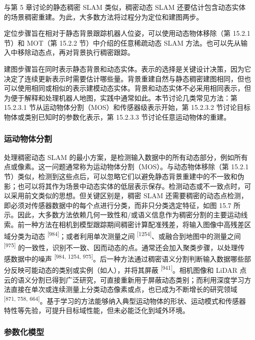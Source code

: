 与第 5 章讨论的静态稠密 SLAM 类似，稠密动态 SLAM 还要估计包含动态实体的场景稠密重建。为此，大多数方法将过程分为定位和建图两步。

定位步骤旨在相对于静态背景跟踪机器人位姿，可以使用动态物体移除（第 15.2.1 节）和 MOT（第 15.2.2 节）中介绍的任意稀疏动态 SLAM 方法。也可以先从输入中移除动态点，再对背景执行稠密跟踪。

建图步骤旨在同时表示静态背景和动态实体。表示的选择是关键设计决策，因为它决定了连续更新表示时需要估计哪些量。背景重建自然与静态稠密建图相同，但也可以使用相同或相似的表示建模动态实体。背景和动态实体不必采用相同表示，但为便于解释和处理机器人地图，实践中通常如此。本节讨论几类常见方法：第 15.2.3.1 节从运动物体分割（MOS）和传感器级表示开始，第 15.2.3.2 节讨论目标物体或类别已知时的参数化表示，第 15.2.3.3 节讨论任意运动物体的重建。

\subsubsection{运动物体分割}

处理稠密动态 SLAM 的最小方案，是检测输入数据中的所有动态部分，例如所有点或像素。这一问题通常称为运动物体分割（MOS）。与动态物体移除（第 15.2.1 节）类似，检测到这些点后，可以忽略它们以避免静态背景重建中的不一致和伪影；也可以将其作为场景中动态实体的低层表示保存。检测动态或不一致点时，可以采用前文类似的思想。但关键区别是，稠密 SLAM 还需要稠密的动态点检测，即必须对传感器数据中的每个点进行分类，而非只分类选定特征，如图 15.7 所示。因此，大多数方法依赖几何一致性和/或语义信息作为稠密分割的主要运动线索。前一种方法在相机到模型跟踪期间稠密计算配准残差，将输入图像中高残差区域分类为动态 \textsuperscript{[984]}；或者利用单次测量之间 \textsuperscript{[1254]}、或融合到地图中的测量之间 \textsuperscript{[975]} 的一致性，识别不一致、因而动态的点。通常还会加入聚类步骤，以处理传感数据中的噪声 \textsuperscript{[984, 1254, 975]}。后一种方法通过稠密语义分割判断输入数据哪些部分反映可能动态的类别或实例（如人），并将其屏蔽 \textsuperscript{[941]}。相机图像和 LiDAR 点云的语义分割已得到广泛研究，可直接重新用于屏蔽动态类别；而利用深度学习方法直接在单次或连续测量上分类动态像素或点，也已成为不断增长的研究领域 \textsuperscript{[871, 758, 664]}。基于学习的方法能够纳入典型运动物体的形状、运动模式和传感器特性等先验，可提升目标域性能，但未必能泛化到域外环境。

\subsubsection{参数化模型}

